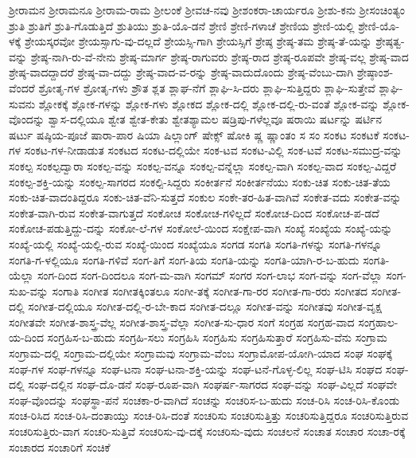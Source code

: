 ಶ್ರೀರಾಮನ
ಶ್ರೀರಾಮನೂ
ಶ್ರೀರಾಮ-ರಾಮ
ಶ್ರೀಲಂಕೆ
ಶ್ರೀವಚ-ನವು
ಶ್ರೀಶಂಕರಾ-ಚಾರ್ಯರೂ
ಶ್ರೀಶು-ಕನು
ಶ್ರೀಸಂಚಿಂತ್ಯಂ
ಶ್ರುತಿ
ಶ್ರುತಿಗೆ
ಶ್ರುತಿ-ಗೊಡುತ್ತಿದೆ
ಶ್ರುತಿಯು
ಶ್ರುತಿ-ಯೊ-ಡನೆ
ಶ್ರೇಣಿ
ಶ್ರೇಣಿ-ಗಳಾಚೆ
ಶ್ರೇಣಿಯ
ಶ್ರೇಣಿ-ಯಲ್ಲಿ
ಶ್ರೇಣಿ-ಯೊ-ಳಕ್ಕೆ
ಶ್ರೇಯಸ್ಕರವೋ
ಶ್ರೇಯಸ್ಸಾಗು-ವು-ದಲ್ಲದೆ
ಶ್ರೇಯಸ್ಸಿ-ಗಾಗಿ
ಶ್ರೇಯಸ್ಸಿಗೆ
ಶ್ರೇಷ್ಠ
ಶ್ರೇಷ್ಠ-ತಮ
ಶ್ರೇಷ್ಠ-ತೆ-ಯನ್ನು
ಶ್ರೇಷ್ಠತ್ವ-ವನ್ನು
ಶ್ರೇಷ್ಠ-ನಾಗಿ-ರು-ವೆ-ನೇನು
ಶ್ರೇಷ್ಠ-ಮಾರ್ಗ
ಶ್ರೇಷ್ಠ-ರಾಗುವರು
ಶ್ರೇಷ್ಠ-ರಾದ
ಶ್ರೇಷ್ಠ-ರೂಪವೇ
ಶ್ರೇಷ್ಠ-ವಲ್ಲ
ಶ್ರೇಷ್ಠ-ವಾದ
ಶ್ರೇಷ್ಠ-ವಾದದ್ದಾದರೆ
ಶ್ರೇಷ್ಠ-ವಾ-ದದ್ದು
ಶ್ರೇಷ್ಠ-ವಾದ-ವ-ರನ್ನು
ಶ್ರೇಷ್ಠ-ವಾದುದೊಂದು
ಶ್ರೇಷ್ಠ-ವೆಂಬು-ದಾಗಿ
ಶ್ರೇಷ್ಠಾಂಶ-ವೆಂದರೆ
ಶ್ರೋತೃ-ಗಳ
ಶ್ರೋತೃ-ಗಳು
ಶ್ರೌತ
ಶ್ಲತ
ಶ್ಲಾಘ-ನೆಗೆ
ಶ್ಲಾಘಿ-ಸಿ-ದರು
ಶ್ಲಾಘಿ-ಸುತ್ತಿದ್ದರು
ಶ್ಲಾಘಿ-ಸುತ್ತೇವೆ
ಶ್ಲಾಘಿ-ಸುವನು
ಶ್ಲೋಕಕ್ಕೆ
ಶ್ಲೋಕ-ಗಳನ್ನು
ಶ್ಲೋಕ-ಗಳು
ಶ್ಲೋಕದ
ಶ್ಲೋಕ-ದಲ್ಲಿ
ಶ್ಲೋಕ-ದಲ್ಲಿ-ರು-ವಂತೆ
ಶ್ಲೋಕ-ವನ್ನು
ಶ್ಲೋಕ-ವೊಂದನ್ನು
ಶ್ವಾಸ-ದಲ್ಲಿಯೂ
ಶ್ವೇತ
ಶ್ವೇತ-ಕೇತು
ಶ್ವೇತಶ್ಯಾಮಲ
ಷಡ್ರಿಪು-ಗಳೆಲ್ಲವೂ
ಷರಾಯಿ
ಷರ್ಟನ್ನು
ಷರ್ಟಿನ
ಷರ್ಟು
ಷಷ್ಠಿಯ-ಪೂಜೆ
ಷಾರಾ-ಪಾರ
ಷಿಯಾ
ಷಿಲ್ಲಾಂಗ್
ಷೇಕ್ಸ್
ಷೋಕಿ
ಷ್ಣ
ಷ್ಣಾಂತಂ
ಸ
ಸಂ
ಸಂಕಟ
ಸಂಕಟಕೆ
ಸಂಕಟ-ಗಳ
ಸಂಕಟ-ಗಳ-ನೀಡಾಡುತ
ಸಂಕಟದ
ಸಂಕಟ-ದಲ್ಲಿಯೇ
ಸಂಕ-ಟವ
ಸಂಕಟ-ವಿಲ್ಲಿ
ಸಂಕ-ಟವೆ
ಸಂಕಟ-ಸಮುದ್ರ-ವನ್ನು
ಸಂಕಲ್ಪ
ಸಂಕಲ್ಪದ್ವಾರಾ
ಸಂಕಲ್ಪ-ವನ್ನು
ಸಂಕಲ್ಪ-ವನ್ನೂ
ಸಂಕಲ್ಪ-ವನ್ನೆಲ್ಲಾ
ಸಂಕಲ್ಪ-ವಾಗಿ
ಸಂಕಲ್ಪ-ವಾದ
ಸಂಕಲ್ಪ-ವಿದ್ದರೆ
ಸಂಕಲ್ಪ-ಶಕ್ತಿ-ಯನ್ನು
ಸಂಕಲ್ಪ-ಸಾಗರದ
ಸಂಕಲ್ಪಿ-ಸಿದ್ದರು
ಸಂಕೀರ್ತನೆ
ಸಂಕೀರ್ತನೆಯು
ಸಂಕು-ಚಿತ
ಸಂಕು-ಚಿತ-ತೆಯ
ಸಂಕು-ಚಿತ-ವಾದಂತಿದ್ದರೂ
ಸಂಕು-ಚಿತ-ವೆನಿ-ಸುತ್ತದೆ
ಸಂಕುಲ
ಸಂಕೇ-ತರ-ಹಿತ-ವಾಗಿವೆ
ಸಂಕೇತ-ವದು
ಸಂಕೇತ-ವನ್ನು
ಸಂಕೇತ-ವಾಗಿ-ರುವ
ಸಂಕೇತ-ವಾಗುತ್ತದೆ
ಸಂಕೋಚ
ಸಂಕೋಚ-ಗಳಿಲ್ಲದೆ
ಸಂಕೋಚ-ದಿಂದ
ಸಂಕೋಚ-ಪ-ಡದೆ
ಸಂಕೋಚ-ಪಡುತ್ತಿದ್ದು-ದನ್ನು
ಸಂಕೋ-ಲೆ-ಗಳ
ಸಂಕೋಲೆ-ಯಿಂದ
ಸಂಕ್ಷೇಪ-ವಾಗಿ
ಸಂಖ್ಯೆ
ಸಂಖ್ಯೆಯ
ಸಂಖ್ಯೆ-ಯನ್ನು
ಸಂಖ್ಯೆ-ಯಲ್ಲಿ
ಸಂಖ್ಯೆ-ಯಲ್ಲಿ-ರುವ
ಸಂಖ್ಯೆ-ಯಿಂದ
ಸಂಖ್ಯೆಯೂ
ಸಂಗಡ
ಸಂಗತಿ
ಸಂಗತಿ-ಗಳನ್ನು
ಸಂಗತಿ-ಗಳನ್ನೂ
ಸಂಗತಿ-ಗ-ಳಲ್ಲಿಯೂ
ಸಂಗತಿ-ಗಳಿವೆ
ಸಂಗ-ತಿಗೆ
ಸಂಗ-ತಿಯ
ಸಂಗತಿ-ಯನ್ನು
ಸಂಗತಿ-ಯಾಗಿ-ರ-ಬ-ಹುದು
ಸಂಗತಿ-ಯೆಲ್ಲಾ
ಸಂಗ-ದಿಂದ
ಸಂಗ-ದಿಂದಲೂ
ಸಂಗ-ಮ-ವಾಗಿ
ಸಂಗಮ್
ಸಂಗರ
ಸಂಗ-ಲಾಭ
ಸಂಗ-ವನ್ನು
ಸಂಗ-ವೆಲ್ಲಾ
ಸಂಗ-ಸುಖ-ವನ್ನು
ಸಂಗಾತಿ
ಸಂಗೀತ
ಸಂಗೀತಕ್ಕಿಂತಲೂ
ಸಂಗೀ-ತಕ್ಕೆ
ಸಂಗೀತ-ಗಾ-ರರ
ಸಂಗೀತ-ಗಾ-ರರು
ಸಂಗೀತದ
ಸಂಗೀತ-ದಲ್ಲಿ
ಸಂಗೀತ-ದಲ್ಲಿಯೂ
ಸಂಗೀತ-ದಲ್ಲಿ-ರ-ಬೇ-ಕಾದ
ಸಂಗೀತ-ದಲ್ಲೂ
ಸಂಗೀತ-ವನ್ನು
ಸಂಗೀತವು
ಸಂಗೀತ-ವೃಕ್ಷ
ಸಂಗೀತವೇ
ಸಂಗೀತ-ಶಾಸ್ತ್ರ-ವೆಲ್ಲ
ಸಂಗೀತ-ಶಾಸ್ತ್ರ-ವೆಲ್ಲಾ
ಸಂಗೀತ-ಸು-ಧಾರ
ಸಂಗೆ
ಸಂಗ್ರಹ
ಸಂಗ್ರಹ-ವಾದ
ಸಂಗ್ರಹಾಲ-ಯ-ದಿಂದ
ಸಂಗ್ರಹಿಸ-ಬ-ಹುದು
ಸಂಗ್ರಹಿ-ಸಲು
ಸಂಗ್ರಹಿಸಿ
ಸಂಗ್ರಹಿಸು
ಸಂಗ್ರಹಿಸುತ್ತಾರೆ
ಸಂಗ್ರಹಿಸು-ವೆನು
ಸಂಗ್ರಾಮ
ಸಂಗ್ರಾಮ-ದಲ್ಲಿ
ಸಂಗ್ರಾಮ-ದಲ್ಲಿಯೇ
ಸಂಗ್ರಾಮವು
ಸಂಗ್ರಾಮ-ವೆಂಬ
ಸಂಗ್ರಾಮೋಪ-ಯೋಗಿ-ಯಾದ
ಸಂಘ
ಸಂಘಕ್ಕೆ
ಸಂಘ-ಗಳ
ಸಂಘ-ಗಳನ್ನೂ
ಸಂಘ-ಟನಾ
ಸಂಘ-ಟನಾ-ಶಕ್ತಿ-ಯನ್ನು
ಸಂಘ-ಟನೆ-ಗೊಳ್ಳ-ಲಿಲ್ಲ
ಸಂಘ-ಟಿಸಿ
ಸಂಘದ
ಸಂಘ-ದಲ್ಲಿ
ಸಂಘ-ದಲ್ಲಿನ
ಸಂಘ-ದೊ-ಡನೆ
ಸಂಘ-ರೂಪ-ವಾಗಿ
ಸಂಘರ್ಷ-ಸಾಗರದ
ಸಂಘ-ವನ್ನು
ಸಂಘ-ವಿಲ್ಲದೆ
ಸಂಘವೇ
ಸಂಘ-ವೊಂದನ್ನು
ಸಂಘಸ್ಥಾ-ಪನೆ
ಸಂಚಕಾ-ರ-ವಾಗಿದೆ
ಸಂಚನ್ನು
ಸಂಚರಿಸ-ಬ-ಹುದು
ಸಂಚ-ರಿಸಿ
ಸಂಚ-ರಿಸಿ-ಕೊಂಡು
ಸಂಚ-ರಿಸಿದ
ಸಂಚ-ರಿಸಿ-ದಂತಾಯ್ತು
ಸಂಚ-ರಿಸಿ-ದಂತೆ
ಸಂಚರಿಸು
ಸಂಚರಿಸುತ್ತಿತ್ತು
ಸಂಚರಿಸುತ್ತಿದ್ದರೂ
ಸಂಚರಿಸುತ್ತಿರುವ
ಸಂಚರಿಸುತ್ತಿರು-ವಾಗ
ಸಂಚರಿ-ಸುತ್ತಿವೆ
ಸಂಚರಿಸು-ವು-ದಕ್ಕೆ
ಸಂಚರಿಸು-ವುದು
ಸಂಚಲನೆ
ಸಂಚಾತ
ಸಂಚಾರ
ಸಂಚಾ-ರಕ್ಕೆ
ಸಂಚಾರದ
ಸಂಚಾರಿಗೆ
ಸಂಚಿಕೆ
